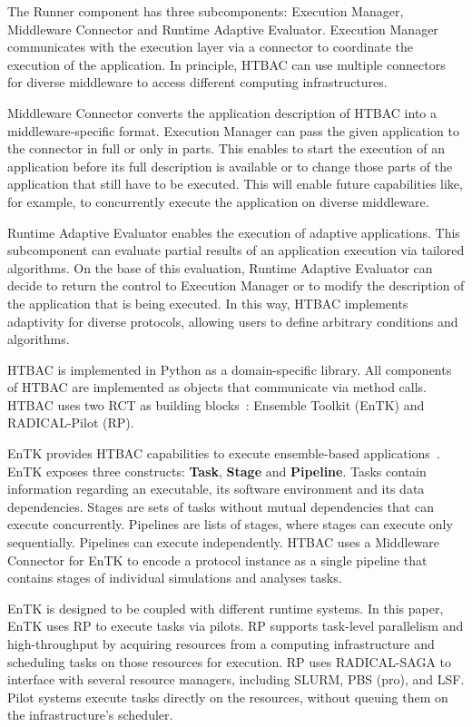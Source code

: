 The Runner component has three subcomponents: Execution Manager, Middleware
Connector and Runtime Adaptive Evaluator. Execution Manager communicates with
the execution layer via a connector to coordinate the execution of the
application. In principle, HTBAC can use multiple connectors for diverse
middleware to access different computing infrastructures.

Middleware Connector converts the application description of HTBAC into a
middleware-specific format. Execution Manager can pass the given application
to the connector in full or only in parts. This enables to start the
execution of an application before its full description is available or to
change those parts of the application that still have to be executed. This
will enable future capabilities like, for example, to concurrently execute
the application on diverse middleware.

Runtime Adaptive Evaluator enables the execution of adaptive applications.
This subcomponent can evaluate partial results of an application execution
via tailored algorithms. On the base of this evaluation, Runtime Adaptive
Evaluator can decide to return the control to Execution Manager or to modify
the description of the application that is being executed. In this way, HTBAC
implements adaptivity for diverse protocols, allowing users to define
arbitrary conditions and algorithms.

HTBAC is implemented in Python as a domain-specific library. All components
of HTBAC are implemented as objects that communicate via method calls. HTBAC
uses two RCT as building blocks~\cite{bb_ccgrid18}: Ensemble Toolkit
(EnTK) and RADICAL-Pilot (RP).

EnTK provides HTBAC capabilities to execute ensemble-based
applications~\cite{power-of-many17}. EnTK exposes three constructs:
\textbf{Task}, \textbf{Stage} and \textbf{Pipeline}. Tasks contain
information regarding an executable, its software environment and its data
dependencies. Stages are sets of tasks without mutual dependencies that can
execute concurrently. Pipelines are lists of stages, where stages can execute
only sequentially. Pipelines can execute independently. HTBAC uses a
Middleware Connector for EnTK to encode a protocol instance as a single
pipeline that contains stages of individual simulations and analyses tasks.

EnTK is designed to be coupled with different runtime systems. In this paper,
EnTK uses RP to execute tasks via pilots. RP supports task-level parallelism
and high-throughput by acquiring resources from a computing infrastructure
and scheduling tasks on those resources for execution. RP uses RADICAL-SAGA
to interface with several resource managers, including SLURM, PBS (pro), and
LSF. Pilot systems execute tasks directly on the resources, without queuing
them on the infrastructure's scheduler.

